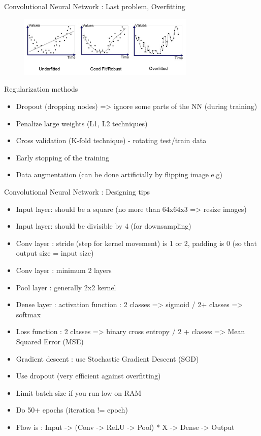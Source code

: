 \documentclass[tikz,table,border=2mm]{beamer}
\begin{document}
\begin{frame}{Convolutional Neural Network : Last problem, Overfitting}
\begin{figure}[ht]
    \centering
    \includegraphics[width=0.75\textwidth]{images/overfitting_1.png}
\end{figure}
\begin{block}{Regularization methods}
\begin{itemize}
  \item Dropout (dropping nodes) => ignore some parts of the NN (during training)
  \item Penalize large weights (L1, L2 techniques)
  \item Cross validation (K-fold technique) - rotating test/train data
  \item Early stopping of the training
  \item Data augmentation (can be done artificially by flipping image e.g)
\end{itemize}
\end{block}
\end{frame}
\begin{frame}{Convolutional Neural Network : Designing tips}
\begin{itemize}
 \item Input layer: should be a square (no more than 64x64x3 => resize images)
 \item Input layer: should be divisible by 4 (for downsampling)
 \item Conv layer : stride (step for kernel movement) is 1 or 2, padding is 0 (so that output size = input size)
  \item Conv layer : minimum 2 layers
 \item Pool layer : generally 2x2 kernel
 \item Dense layer : activation function : 2 classes => sigmoid / 2+ classes => softmax
 \item Loss function :  2 classes => binary cross entropy / 2 + classes => Mean Squared Error (MSE)
 \item Gradient descent : use Stochastic Gradient Descent (SGD)
 \item Use dropout (very efficient against overfitting)
 \item Limit batch size if you run low on RAM
 \item Do 50+ epochs (iteration != epoch)
 \item Flow is : Input -> (Conv -> ReLU -> Pool) * X -> Dense -> Output
\end{itemize}
\end{frame}
\end{document}
